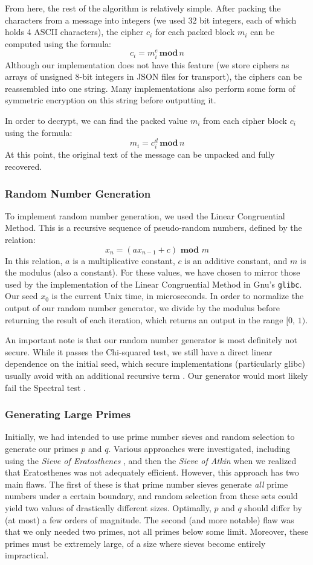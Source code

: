 \documentclass{article}
\newcommand{\code}[1]{\colorbox{light-gray}{\texttt{#1}}}
\begin{document}
From here, the rest of the algorithm is relatively simple. After packing the characters from a message into integers (we used 32 bit integers, each of which holds 4 ASCII characters), the cipher $c_i$ for each packed block $m_i$ can be computed using the formula:
\[ c_i = m_i^e\, \textbf{mod} \, n \]
Although our implementation does not have this feature (we store ciphers as arrays of unsigned 8-bit integers in JSON files for transport), the ciphers can be reassembled into one string. Many implementations also perform some form of symmetric encryption on this string before outputting it.

In order to decrypt, we can find the packed value $m_i$ from each cipher block $c_i$ using the formula:
	\[ m_i = c_i^d \,\textbf{mod}\, n \]
At this point, the original text of the message can be unpacked and fully recovered.

\subsubsection{Random Number Generation}
To implement random number generation, we used the Linear Congruential Method. This is a recursive sequence of pseudo-random numbers, defined by the relation:
\[ x_n = (ax_{n - 1} + c) \textbf{ mod } m \]
In this relation, $a$ is a multiplicative constant, $c$ is an additive constant, and $m$ is the modulus (also a constant). For these values, we have chosen to mirror those used by the implementation of the Linear Congruential Method in Gnu's \code{glibc}. Our seed $x_0$ is the current Unix time, in microseconds. In order to normalize the output of our random number generator, we divide by the modulus before returning the result of each iteration, which returns an output in the range $[0,\, 1)$.

An important note is that our random number generator is most definitely not secure. While it passes the Chi-squared test, we still have a direct linear dependence on the initial seed, which secure implementations (particularly glibc) usually avoid with an additional recursive term \cite{lcm}. Our generator would most likely fail the Spectral test \cite{spectral}.

\subsubsection{Generating Large Primes}
Initially, we had intended to use prime number sieves and random selection to generate our primes $p$ and $q$. Various approaches were investigated, including using the \textit{Sieve of Eratosthenes} \cite{sieveeratosthenes}, and then the \textit{Sieve of Atkin} \cite{sieveatkin} when we realized that Eratosthenes was not adequately efficient. However, this approach has two main flaws. The first of these is that prime number sieves generate \textit{all} prime numbers under a certain boundary, and random selection from these sets could yield two values of drastically different sizes. Optimally, $p$ and $q$ should differ by (at most) a few orders of magnitude. The second (and more notable) flaw was that we only needed two primes, not all primes below some limit. Moreover, these primes must be extremely large, of a size where sieves become entirely impractical.
\end{document}
